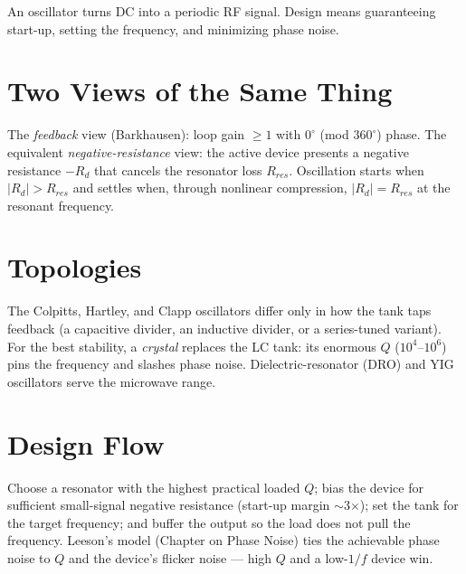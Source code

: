 An oscillator turns DC into a periodic RF signal. Design means guaranteeing
start-up, setting the frequency, and minimizing phase noise.

\section{Two Views of the Same Thing}
The \emph{feedback} view (Barkhausen): loop gain $\ge 1$ with $0^\circ$ (mod
$360^\circ$) phase. The equivalent \emph{negative-resistance} view: the active
device presents a negative resistance $-R_d$ that cancels the resonator loss
$R_{res}$. Oscillation starts when $|R_d| > R_{res}$ and settles when, through
nonlinear compression, $|R_d| = R_{res}$ at the resonant frequency.

\section{Topologies}
The Colpitts, Hartley, and Clapp oscillators differ only in how the tank taps
feedback (a capacitive divider, an inductive divider, or a series-tuned
variant). For the best stability, a \emph{crystal} replaces the LC tank: its
enormous $Q$ ($10^4$--$10^6$) pins the frequency and slashes phase noise.
Dielectric-resonator (DRO) and YIG oscillators serve the microwave range.

\section{Design Flow}
Choose a resonator with the highest practical loaded $Q$; bias the device for
sufficient small-signal negative resistance (start-up margin $\sim$3$\times$);
set the tank for the target frequency; and buffer the output so the load does not
pull the frequency. Leeson's model (Chapter on Phase Noise) ties the achievable
phase noise to $Q$ and the device's flicker noise --- high $Q$ and a low-$1/f$
device win.
